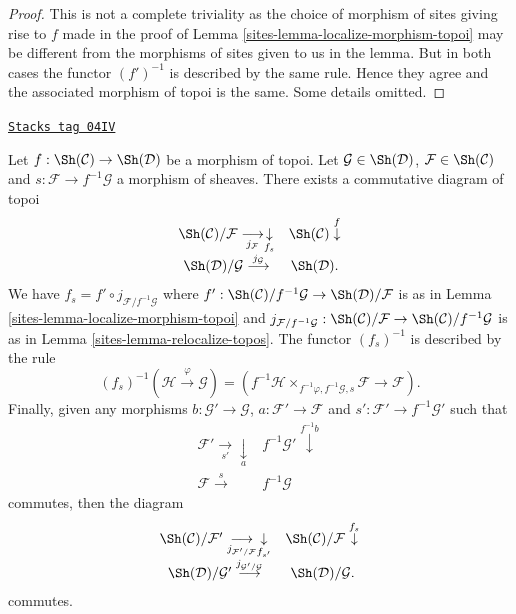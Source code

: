 \begin{proof}

This is not a complete triviality as the choice of morphism of sites
giving rise to $f$ made in the proof of
Lemma \ref{sites-lemma-localize-morphism-topoi}
may be different from the morphisms of sites given to us in the lemma.
But in both cases the functor $(f')^{-1}$ is described by the same
rule. Hence they agree and the associated morphism of topoi is the same.
Some details omitted.
\end{proof}

\begin{lemma}
\label{sites-lemma-relocalize-morphism-topoi}
\href{https://stacks.math.columbia.edu/tag/04IV}{\texttt{Stacks tag 04IV}}

Let $f : \Sh(\mathcal{C}) \to \Sh(\mathcal{D})$
be a morphism of topoi.
Let $\mathcal{G} \in \Sh(\mathcal{D})$,
$\mathcal{F} \in \Sh(\mathcal{C})$
and $s : \mathcal{F} \to f^{-1}\mathcal{G}$ a morphism of sheaves.
There exists a commutative diagram of topoi
$$
\begin{array}{cc}\Sh(\mathcal{C})/\mathcal{F} \underset{j_\mathcal{F}}{\longrightarrow}\underset{f_s}{\downarrow} & \Sh(\mathcal{C}) \overset{f}{\downarrow} \\ \Sh(\mathcal{D})/\mathcal{G} \overset{j_\mathcal{G}}{\longrightarrow} & \Sh(\mathcal{D}).\end{array}
$$
We have $f_s = f' \circ j_{\mathcal{F}/f^{-1}\mathcal{G}}$ where
$f' :
\Sh(\mathcal{C})/f^{-1}\mathcal{G}
\to
\Sh(\mathcal{D})/\mathcal{F}$
is as in
Lemma \ref{sites-lemma-localize-morphism-topoi}
and
$j_{\mathcal{F}/f^{-1}\mathcal{G}} :
\Sh(\mathcal{C})/\mathcal{F}
\to
\Sh(\mathcal{C})/f^{-1}\mathcal{G}$
is as in
Lemma \ref{sites-lemma-relocalize-topos}.
The functor $(f_s)^{-1}$ is described by the rule
$$
(f_s)^{-1}(\mathcal{H} \xrightarrow{\varphi} \mathcal{G})
=
(f^{-1}\mathcal{H} \times_{f^{-1}\varphi, f^{-1}\mathcal{G}, s} \mathcal{F}
\rightarrow \mathcal{F}).
$$
Finally, given any morphisms $b : \mathcal{G}' \to \mathcal{G}$,
$a : \mathcal{F}' \to \mathcal{F}$ and
$s' : \mathcal{F}' \to f^{-1}\mathcal{G}'$ such that
$$
\begin{array}{cc}\mathcal{F}' \underset{s'}{\longrightarrow}\underset{a}{\downarrow} & f^{-1}\mathcal{G}' \overset{f^{-1}b}{\downarrow} \\ \mathcal{F} \overset{s}{\longrightarrow} & f^{-1}\mathcal{G}\end{array}
$$
commutes, then the diagram
$$
\begin{array}{cc}\Sh(\mathcal{C})/\mathcal{F}'
\underset{j_{\mathcal{F}'/\mathcal{F}}}{\longrightarrow}\underset{f_{s'}}{\downarrow} & \Sh(\mathcal{C})/\mathcal{F} \overset{f_s}{\downarrow} \\ \Sh(\mathcal{D})/\mathcal{G}' \overset{j_{\mathcal{G}'/\mathcal{G}}}{\longrightarrow} & \Sh(\mathcal{D})/\mathcal{G}.\end{array}
$$
commutes.
\end{lemma}

